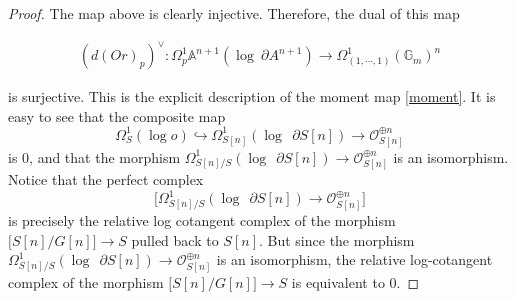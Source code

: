 \documentclass[10pt,a4paper]{amsart}
\begin{document}
\begin{proof}
The map above is clearly injective. Therefore, the dual of this map 

\begin{align}
    (d(Or)_p)^{\vee}: \Omega^1_p \mathbb A^{n+1}(\log~\partial A^{n+1})\longrightarrow \Omega^1_{(1,\cdots, 1)}(\mathbb G_m)^n
\end{align}

is surjective. This is the explicit description of the moment map \ref{moment}. It is easy to see that the composite map
\begin{equation}
\Omega_{S}^{1}(\log o)\hookrightarrow \Omega_{S[n]}^{1}(\log ~~\partial S[n])\longrightarrow \mathcal O_{S[n]}^{\oplus n}
\end{equation}
is $0$, and that the morphism $\Omega_{S[n]/S}^{1}(\log ~~\partial S[n])\longrightarrow \mathcal O_{S[n]}^{\oplus n}$ is an isomorphism.\\

Notice that the perfect complex
\begin{equation}
\big[\Omega_{S[n]/S}^{1}(\log ~~\partial S[n])\longrightarrow \mathcal O_{S[n]}^{\oplus n}\big]
\end{equation}
is precisely the relative log cotangent complex of the morphism $\big[ S[n]/G[n]\big]\longrightarrow S$ pulled back to $S[n]$. But since the morphism $\Omega_{S[n]/S}^{1}(\log ~~\partial S[n])\longrightarrow \mathcal O_{S[n]}^{\oplus n}$ is an isomorphism, the relative log-cotangent complex of the morphism $\big[ S[n]/G[n]\big]\longrightarrow S$ is equivalent to $0$.
\end{proof}
\end{document}
